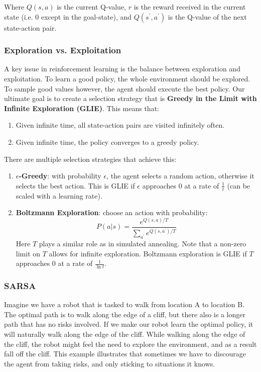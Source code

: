 \documentclass[12pt]{article}
\begin{document}
\noindent
Where $Q(s, a)$ is the current Q-value, $r$ is the reward received in the current state (i.e. 0 except in the goal-state), and $Q(s^\prime, a^\prime)$ is the Q-value of the next state-action pair.

\subsubsection{Exploration vs. Exploitation}
A key issue in reinforcement learning is the balance between exploration and exploitation.
To learn a good policy, the whole environment should be explored.
To sample good values however, the agent should execute the best policy.
Our ultimate goal is to create a selection strategy that is \textbf{Greedy in the Limit with Infinite Exploration (GLIE)}.
This means that:

\begin{enumerate}
    \item Given infinite time, all state-action pairs are visited infinitely often.
    \item Given infinite time, the policy converges to a greedy policy.
\end{enumerate}

\noindent
There are multiple selection strategies that achieve this:

\begin{enumerate}
    \item \textbf{$\epsilon$-Greedy}: with probability $\epsilon$, the agent selects a random action, otherwise it selects the best action.
    This is GLIE if $\epsilon$ approaches 0 at a rate of $\frac{1}{t}$ (can be scaled with a learning rate).
    \item \textbf{Boltzmann Exploration}: choose an action with probability:
    \[ P(a | s) = \frac{e^{Q(s, a)/T}}{\sum_{a^\prime} e^{Q(s, a^\prime)/T}} \]
    Here $T$ plays a similar role as in simulated annealing.
    Note that a non-zero limit on $T$ allows for infinite exploration.
    Boltzmann exploration is GLIE if $T$ approaches 0 at a rate of $\frac{1}{\ln t}$.
\end{enumerate}

\newpage
\subsubsection{SARSA}
Imagine we have a robot that is tasked to walk from location A to location B.
The optimal path is to walk along the edge of a cliff, but there also is a longer path that has no risks involved.
If we make our robot learn the optimal policy, it will naturally walk along the edge of the cliff.
While walking along the edge of the cliff, the robot might feel the need to explore the environment, and as a result fall off the cliff.
This example illustrates that sometimes we have to discourage the agent from taking risks, and only sticking to situations it knows.
\end{document}
